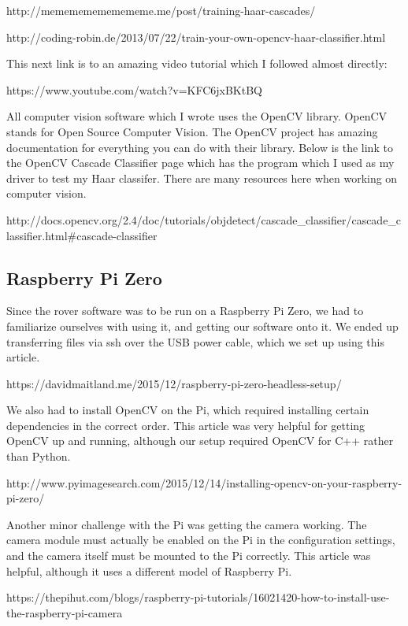 \documentclass[10pt,letterpaper,onecolumn,draftclsnofoot,journal]{IEEEtran}
\begin{document}
\par
http://memememememememe.me/post/training-haar-cascades/
\par
http://coding-robin.de/2013/07/22/train-your-own-opencv-haar-classifier.html\vspace{.3cm}
\par
This next link is to an amazing video tutorial which I followed almost directly:\vspace{.3cm}
\par
https://www.youtube.com/watch?v=KFC6jxBKtBQ\vspace{.3cm}
\par
All computer vision software which I wrote uses the OpenCV library. OpenCV stands for Open Source Computer Vision. The OpenCV project has amazing documentation for everything you can do with their library. Below is the link to the OpenCV Cascade Classifier page which has the program which I used as my driver to test my Haar classifer. There are many resources here when working on computer vision.\vspace{.3cm}
\par   
http://docs.opencv.org/2.4/doc/tutorials/objdetect/cascade\_classifier/cascade\_classifier.html\#cascade-classifier

\subsection{\textbf{Raspberry Pi Zero}}
Since the rover software was to be run on a Raspberry Pi Zero, we had to familiarize ourselves with using it, and getting our software onto it. We ended up transferring files via ssh over the USB power cable, which we set up using this article.\vspace{.3cm}
\par
https://davidmaitland.me/2015/12/raspberry-pi-zero-headless-setup/\vspace{.3cm}
\par
We also had to install OpenCV on the Pi, which required installing certain dependencies in the correct order. This article was very helpful for getting OpenCV up and running, although our setup required OpenCV for C++ rather than Python.\vspace{.3cm}
\par
http://www.pyimagesearch.com/2015/12/14/installing-opencv-on-your-raspberry-pi-zero/\vspace{.3cm}
\par
Another minor challenge with the Pi was getting the camera working. The camera module must actually be enabled on the Pi in the configuration settings, and the camera itself must be mounted to the Pi correctly. This article was helpful, although it uses a different model of Raspberry Pi.\vspace{.3cm}
\par
https://thepihut.com/blogs/raspberry-pi-tutorials/16021420-how-to-install-use-the-raspberry-pi-camera\vspace{.3cm}
\par
\end{document}
